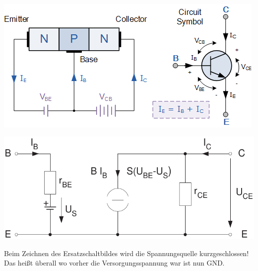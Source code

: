 \documentclass[a5paper, 12pt, twoside]{scrartcl}
\begin{document}
\begin{minipage}{.49\linewidth}
  {\centering
    \includegraphics[width=\textwidth]{Transistor}
    \par
  }
\end{minipage}\hfill\vline\hfill%
\begin{minipage}{.49\linewidth}
  {\centering
    \includegraphics[width=\textwidth]{ESBTransistor}
    \par
  }
\end{minipage}

 Beim Zeichnen des Ersatzschaltbildes wird die Spannungsquelle kurzgeschlossen! Das heißt überall wo vorher die Versorgungsspannung war ist nun GND.
\end{document}
